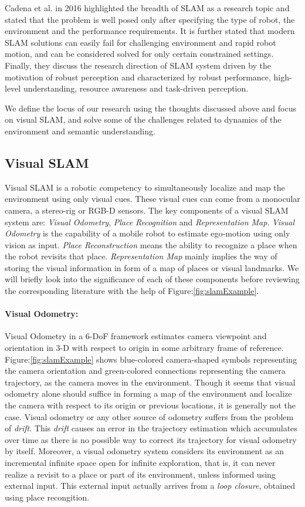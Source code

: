 \documentclass{article}
\begin{document}
Cadena et al. \cite{cadena2016past} in 2016 highlighted the breadth of SLAM as a research topic and stated that the problem is well posed only after specifying the type of robot, the environment and the performance requirements. It is further stated that modern SLAM solutions can easily fail for challenging environment and rapid robot motion, and can be considered solved for only certain constrained settings. Finally, they discuss the research direction of SLAM system driven by the motivation of robust perception and characterized by robust performance, high-level understanding, resource awareness and task-driven perception.

We define the locus of our research using the thoughts discussed above and focus on visual SLAM, and solve some of the challenges related to dynamics of the environment and semantic understanding.

\subsection{Visual SLAM}
Visual SLAM is a robotic competency to simultaneously localize and map the environment using only visual cues. These visual cues can come from a monocular camera, a stereo-rig or RGB-D sensors. The key components of a visual SLAM system are: \emph{Visual Odometry}, \emph{Place Recognition} and \emph{Representation Map}. \emph{Visual Odometry} is the capability of a mobile robot to estimate ego-motion using only vision as input. \emph{Place Reconstruction} means the ability to recognize a place when the robot revisits that place. \emph{Representation Map} mainly implies the way of storing the visual information in form of a map of places or visual landmarks. We will briefly look into the significance of each of these components before reviewing the corresponding literature with the help of Figure:\ref{fig:slamExample}.

\paragraph{Visual Odometry:}
Visual Odometry in a 6-DoF framework estimates camera viewpoint and orientation in 3-D with respect to origin in some arbitrary frame of reference. Figure:\ref{fig:slamExample} shows blue-colored camera-shaped symbols representing the camera orientation and green-colored connections representing the camera trajectory, as the camera moves in the environment. Though it seems that visual odometry alone should suffice in forming a map of the environment and localize the camera with respect to its origin or previous locations, it is generally not the case. Visual odometry or any other source of odometry suffers from the problem of \emph{drift}. This \emph{drift} causes an error in the trajectory estimation which accumulates over time as there is no possible way to correct its trajectory for visual odometry by itself. Moreover, a visual odometry system considers its environment as an incremental infinite space open for infinite exploration, that is, it can never realize a revisit to a place or part of its environment, unless informed using external input. This external input actually arrives from a \emph{loop closure}, obtained using place recongition.
\end{document}
